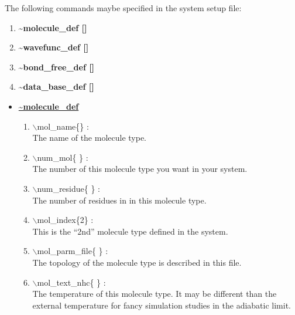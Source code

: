 \documentclass[12pt]{article}
\begin{document}
The following commands maybe specified in the system setup file:
\begin{enumerate}
\LARGE
\item {\bf \~{}molecule\_def []}
\item {\bf \~{}wavefunc\_def []}
\item {\bf \~{}bond\_free\_def []}
\item {\bf \~{}data\_base\_def []}
\end{enumerate}

\begin{itemize}

\clearpage
\huge
\item[] \underline{\bf \~{}molecule\_def}
\begin{enumerate}

 \vspace{0.15in} \Large
 \item  $\backslash$mol\_name\{\} : \\
    \large
   The name of the molecule type.

 \vspace{0.15in} \Large
 \item  $\backslash$num\_mol\{ \} : \\ 
    \large
   The number of this molecule type you want in your system.

 \vspace{0.15in} \Large
 \item  $\backslash$num\_residue\{ \} : \\
    \large
   The number of residues in in this molecule type.

 \vspace{0.15in} \Large
 \item  $\backslash$mol\_index\{2\} : \\ 
    \large
   This is the ``2nd'' molecule type defined in the system.

 \vspace{0.15in} \Large
 \item  $\backslash$mol\_parm\_file\{ \} : \\
    \large
   The topology of the molecule type is described in this file.

 \vspace{0.15in} \Large
 \item  $\backslash$mol\_text\_nhc\{ \} : \\
    \large
   The temperature of this molecule type. It may be different than the
   external temperature for fancy simulation studies in the adiabatic limit.


\end{enumerate}
\end{itemize}
\end{document}
